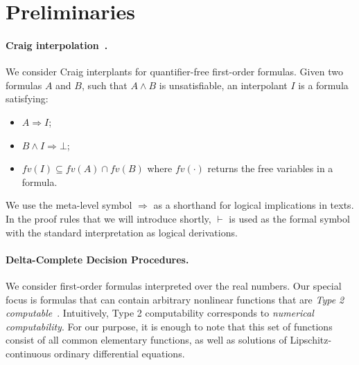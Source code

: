 \section{Preliminaries}
\label{sec:prelim}

\paragraph{Craig interpolation~\cite{MR0104564}.}
We consider Craig interplants for quantifier-free first-order formulas. Given two formulas $A$ and $B$, such that $A ∧ B$ is unsatisfiable, an interpolant $I$ is a formula satisfying:
\begin{itemize}
\item $A ⇒ I$;
\item $B ∧ I ⇒ ⊥$;
\item $fv(I) ⊆ fv(A) ∩ fv(B)$ where $fv(\cdot)$ returns the free variables in a formula.
\end{itemize}
\begin{notation}
We use the meta-level symbol $\Rightarrow$ as a shorthand for logical implications in texts. In the proof rules that we will introduce shortly, $\vdash$ is used as the formal symbol with the standard interpretation as logical derivations. 
\end{notation}

\paragraph{Delta-Complete Decision Procedures.}

We consider first-order formulas interpreted over the real numbers. Our special focus is formulas that can contain arbitrary nonlinear functions that are {\em Type 2 computable}~\cite{CAbook,vasco}. Intuitively, Type 2 computability corresponds to {\em numerical computability}. For our purpose, it is enough to note that this set of functions consist of all common elementary functions, as well as solutions of Lipschitz-continuous ordinary differential equations. 

